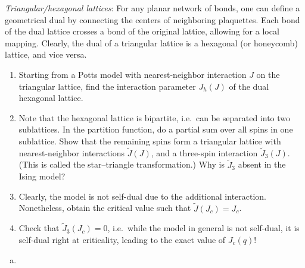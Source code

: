 \begin{problem}
    \textit{Triangular/hexagonal lattices}: For any planar network of bonds, one can define a geometrical dual by connecting the centers of neighboring plaquettes. Each bond of the dual lattice crosses a bond of the original lattice, allowing for a local mapping. Clearly, the dual of a triangular lattice is a hexagonal (or honeycomb) lattice, and vice versa.

    \begin{enumerate}
        \item[(a)] Starting from a Potts model with nearest-neighbor interaction $J$ on the triangular lattice, find the interaction parameter $J_h(J)$ of the dual hexagonal lattice.

        \item[(b)] Note that the hexagonal lattice is bipartite, i.e.\ can be separated into two sublattices. In the partition function, do a partial sum over all spins in one sublattice. Show that the remaining spins form a triangular lattice with nearest-neighbor interactions $\tilde{J}(J)$, and a three-spin interaction $\tilde{J}_3(J)$. (This is called the star--triangle transformation.) Why is $\tilde{J}_3$ absent in the Ising model?

        \item[(c)] Clearly, the model is not self-dual due to the additional interaction. Nonetheless, obtain the critical value such that $\tilde{J}(J_c) = J_c$.

        \item[(d)] Check that $\tilde{J}_3(J_c) = 0$, i.e.\ while the model in general is not self-dual, it is self-dual right at criticality, leading to the exact value of $J_c(q)$!
    \end{enumerate}
\end{problem}

\begin{solution}
    \begin{enumerate}[(a)]
        \item
    \end{enumerate}
\end{solution}

